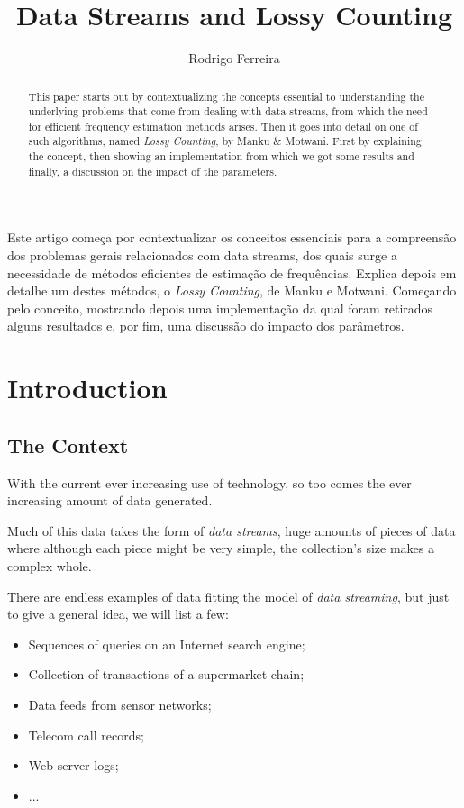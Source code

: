 \documentclass[...]{revdetua}
\begin{document}

\title{Data Streams and Lossy Counting}
\author{Rodrigo Ferreira} %
\maketitle

\begin{resumo}%
	Este artigo começa por contextualizar os conceitos essenciais para a compreensão dos problemas gerais relacionados com data streams, dos quais surge a necessidade de métodos eficientes de estimação de frequências.
Explica depois em detalhe um destes métodos, o \textit{Lossy Counting}, de Manku e Motwani. Começando pelo conceito, mostrando depois uma implementação da qual foram retirados alguns resultados e, por fim, uma discussão do impacto dos parâmetros.
\end{resumo}

\begin{abstract}%
 This paper starts out by contextualizing the concepts essential to understanding the underlying problems that come from dealing with data streams, from which the need for efficient frequency estimation methods arises.
 Then it goes into detail on one of such algorithms, named \textit{Lossy Counting}, by Manku \& Motwani. First by explaining the concept, then showing an implementation from which we got some results and finally, a discussion on the impact of the parameters.
\end{abstract}
\section{Introduction}
\subsection{The Context}
With the current ever increasing use of technology, so too comes the ever increasing amount of data generated.\par
Much of this data takes the form of \textit{data streams}, huge amounts of pieces of data where although each piece might be very simple, the collection's size makes a complex whole.\par
There are endless examples of data fitting the model of \textit{data streaming}, but just to give a general idea, we will list a few:
\begin{itemize}
\item Sequences of queries on an Internet search engine;
\item Collection of transactions of a supermarket chain;
\item Data feeds from sensor networks;
\item Telecom call records;
\item Web server logs;
\item ...
\end{itemize}
\end{document}
